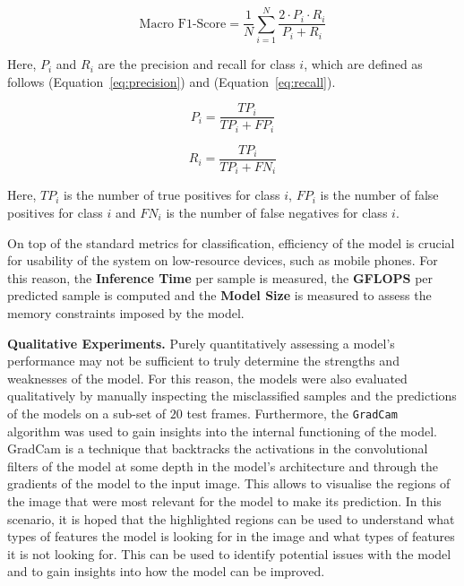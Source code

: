 \documentclass[a4paper]{article}
\begin{document}
  \begin{equation}
    \text{Macro F1-Score} = \frac{1}{N} \sum_{i=1}^{N} \frac{2 \cdot P_i \cdot 
    R_i}{P_i + R_i}
    \label{eq:macro-f1}
  \end{equation}

  Here, $P_i$ and $R_i$ are the precision and recall for class $i$, which are 
  defined as follows (Equation~\ref{eq:precision}) and (Equation~\ref{eq:recall}).

  \begin{equation}
    P_i = \frac{TP_i}{TP_i + FP_i}
    \label{eq:precision}
  \end{equation}

  \begin{equation}
    R_i = \frac{TP_i}{TP_i + FN_i}
    \label{eq:recall}
  \end{equation}

  Here, $TP_i$ is the number of true positives for class $i$, $FP_i$ is the
  number of false positives for class $i$ and $FN_i$ is the number of false
  negatives for class $i$. 

  On top of the standard metrics for classification, efficiency of the model is
  crucial for usability of the system on low-resource devices, such as mobile
  phones. For this reason, the \textbf{Inference Time} per sample is measured, 
  the \textbf{GFLOPS} per predicted sample is computed and the \textbf{Model
  Size} is measured to assess the memory constraints imposed by the model.

  \textbf{Qualitative Experiments.} Purely quantitatively assessing a model's
  performance may not be sufficient to truly determine the strengths and
  weaknesses of the model. For this reason, the models were also evaluated
  qualitatively by manually inspecting the misclassified samples and
  the predictions of the models on a sub-set of $20$ test frames. 
  Furthermore, the \texttt{GradCam}~\cite{gradcam} algorithm was used to gain 
  insights into the internal functioning of the model. GradCam is a technique
  that backtracks the activations in the convolutional filters of the model at
  some depth in the model's architecture and through the gradients of the model
  to the input image. This allows to visualise the regions of the image that
  were most relevant for the model to make its prediction. In this scenario, it
  is hoped that the highlighted regions can be used to understand what types of
  features the model is looking for in the image and what types of features it
  is not looking for. This can be used to identify potential issues with the
  model and to gain insights into how the model can be improved.
\end{document}

